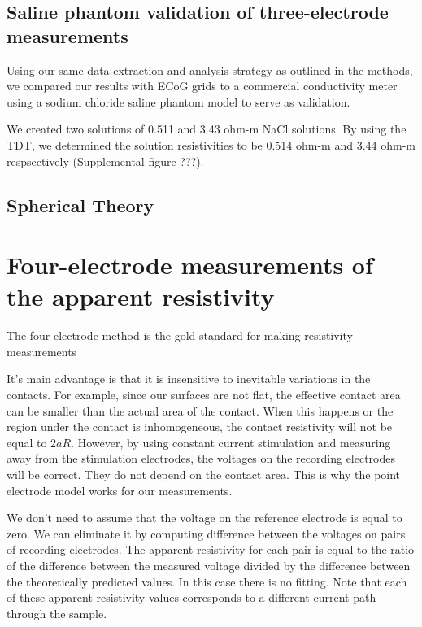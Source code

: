 \subsection{Saline phantom validation of three-electrode measurements}

Using our same data extraction and analysis strategy as outlined in the methods, we compared our results with ECoG grids to a commercial conductivity meter using a sodium chloride saline phantom model to serve as validation. 

We created two solutions of 0.511 and 3.43 ohm-m NaCl solutions. By using the TDT, we determined the solution resistivities to be 0.514 ohm-m and 3.44 ohm-m respsectively (Supplemental figure ???). 

\subsection{Spherical Theory}

\section{Four-electrode measurements of the apparent resistivity}

The four-electrode method is the gold standard for making resistivity measurements \cite{Miccoli2015}

It's main advantage is that it is insensitive to inevitable variations in the contacts. For example, since our surfaces are not flat, the effective contact area can be smaller than the actual area of the
contact. When this happens or the region under the contact is inhomogeneous, the contact resistivity will not be equal to $2aR$. However, by using constant current stimulation and measuring away from the stimulation electrodes, the voltages on the recording electrodes will be correct. They do not depend on the contact area. This is why the point electrode model works for our measurements.

We don't need to assume that the voltage on the reference electrode is equal to zero. We can eliminate it by computing difference between the voltages on pairs of recording electrodes. The apparent resistivity for each pair is equal to the ratio of the difference between the measured voltage divided by the difference between the theoretically predicted values. In this case there is no fitting. Note that each of these apparent resistivity values corresponds to a different current path through the sample.


